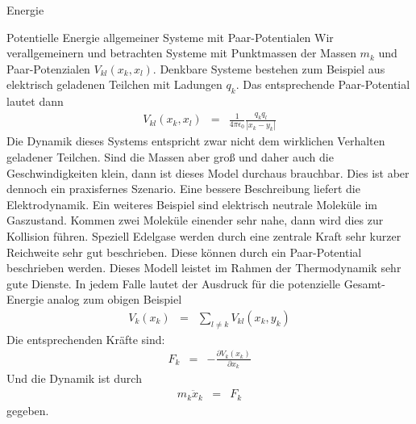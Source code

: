 \begin{chapter}{\titlestr}
\begin{section}{Energie}
\begin{subsection}{Potentielle Energie allgemeiner Systeme mit Paar-Potentialen}
Wir verallgemeinern und betrachten Systeme mit Punktmassen der Massen $m_k$ und Paar-Potenzialen
$V_{kl}(x_k,x_l)$. Denkbare Systeme bestehen zum Beispiel aus elektrisch geladenen Teilchen mit Ladungen $q_k$.
Das entsprechende Paar-Potential lautet dann
\begin{eqnarray*}
V_{kl}(x_k,x_l) &=& \frac{1}{4\pi\epsilon_0}\frac{q_kq_l}{|x_k-y_k|}
\end{eqnarray*}
Die Dynamik dieses Systems entspricht zwar nicht dem wirklichen Verhalten geladener Teilchen. Sind die Massen aber groß und daher auch die Geschwindigkeiten klein, dann ist dieses Model durchaus brauchbar. Dies ist aber dennoch ein praxisfernes Szenario. Eine bessere
Beschreibung liefert die Elektrodynamik. Ein weiteres Beispiel sind elektrisch neutrale Moleküle im Gaszustand. Kommen zwei Moleküle
einender sehr nahe, dann wird dies zur Kollision führen. Speziell Edelgase werden durch eine zentrale Kraft sehr kurzer Reichweite
sehr gut beschrieben. Diese können durch ein Paar-Potential beschrieben werden. Dieses Modell leistet im Rahmen der Thermodynamik sehr gute Dienste. In jedem Falle lautet der Ausdruck für die potenzielle Gesamt-Energie analog zum obigen Beispiel
\begin{eqnarray*}
V_k(x_k) &=& \sum_{l\ne k} V_{kl}(x_k,y_k)
\end{eqnarray*}
Die entsprechenden Kräfte sind:
\begin{eqnarray*}
F_k &=& -\frac{\partial V_k(x_k)}{\partial x_k}
\end{eqnarray*}
Und die Dynamik ist durch
\begin{eqnarray*}
m_k\ddot{x}_k &=& F_k
\end{eqnarray*}
gegeben.
\end{subsection}


\end{section}
\end{chapter}
